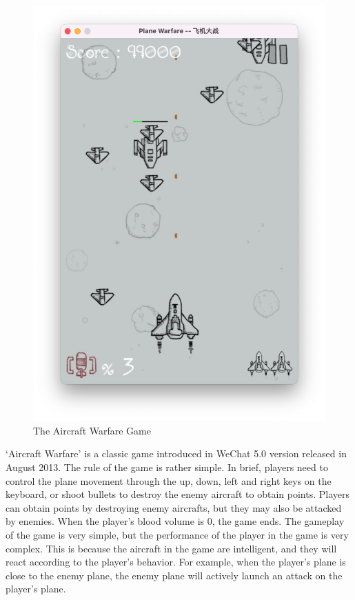 \documentclass{article}
\begin{document}
    \begin{figure}
        \centering
        \includegraphics[width=\linewidth]{pictures/game.jpg}
        \caption{The Aircraft Warfare Game}
        \label{fig:aircraft_warfare_game}
    \end{figure}
    
    `Aircraft Warfare' is a classic game introduced in WeChat 5.0 version released in August 2013.
    The rule of the game is rather simple. In brief, players need to control the plane movement through the up, down, left and right keys on the keyboard, or shoot bullets to destroy the enemy aircraft to obtain points.
    Players can obtain points by destroying enemy aircrafts, but they may also be attacked by enemies. When the player's blood volume is 0, the game ends.
    The gameplay of the game is very simple, but the performance of the player in the game is very complex. This is because the aircraft in the game are intelligent, and they will react according to the player's behavior.
    For example, when the player's plane is close to the enemy plane, the enemy plane will actively launch an attack on the player's plane.
\end{document}
